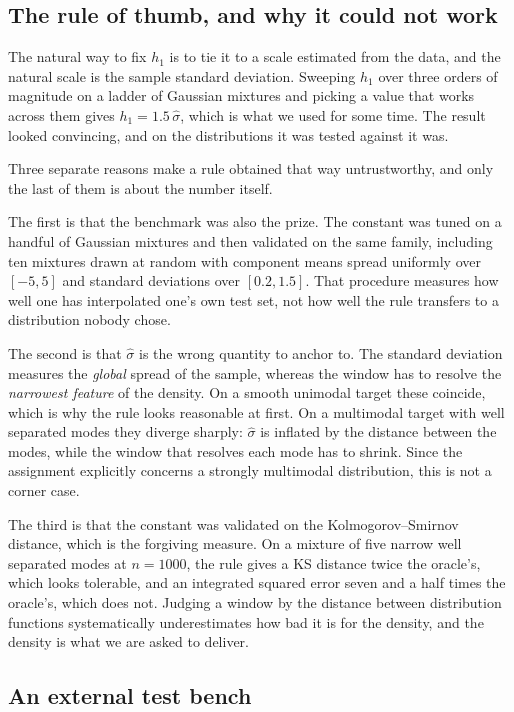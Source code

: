 \documentclass[11pt]{article}
\newcommand{\shat}{\hat{\sigma}}
\begin{document}
\subsection{The rule of thumb, and why it could not work}

The natural way to fix $h_1$ is to tie it to a scale estimated from the data, and the natural
scale is the sample standard deviation. Sweeping $h_1$ over three orders of magnitude on a
ladder of Gaussian mixtures and picking a value that works across them gives
$h_1 = 1.5\,\shat$, which is what we used for some time. The result looked convincing, and on
the distributions it was tested against it was.

Three separate reasons make a rule obtained that way untrustworthy, and only the last of them
is about the number itself.

The first is that the benchmark was also the prize. The constant was tuned on a handful of
Gaussian mixtures and then validated on the same family, including ten mixtures drawn at
random with component means spread uniformly over $[-5, 5]$ and standard deviations over
$[0.2, 1.5]$. That procedure measures how well one has interpolated one's own test set, not
how well the rule transfers to a distribution nobody chose.

The second is that $\shat$ is the wrong quantity to anchor to. The standard deviation
measures the \emph{global} spread of the sample, whereas the window has to resolve the
\emph{narrowest feature} of the density. On a smooth unimodal target these coincide, which
is why the rule looks reasonable at first. On a multimodal target with well separated modes
they diverge sharply: $\shat$ is inflated by the distance between the modes, while the
window that resolves each mode has to shrink. Since the assignment explicitly concerns a
strongly multimodal distribution, this is not a corner case.

The third is that the constant was validated on the Kolmogorov--Smirnov distance, which is
the forgiving measure. On a mixture of five narrow well separated modes at $n = 1000$, the
rule gives a KS distance twice the oracle's, which looks tolerable, and an integrated
squared error seven and a half times the oracle's, which does not. Judging a window by the
distance between distribution functions systematically underestimates how bad it is for the
density, and the density is what we are asked to deliver.

\subsection{An external test bench}
\end{document}
